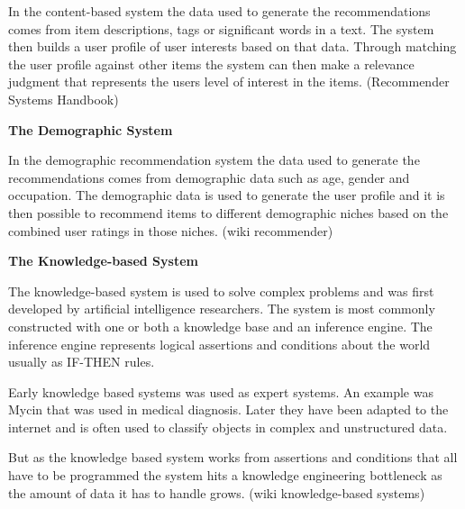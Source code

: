 In the content-based system the data used to generate the recommendations comes from item descriptions, tags or significant words in a text. The system then builds a user profile of user interests based on that data. Through matching the user profile against other items the system can then make a relevance judgment that represents the users level of interest in the items. (Recommender Systems Handbook)


\textbf{The Demographic System}

In the demographic recommendation system the data used to generate the recommendations comes from demographic data such as age, gender and occupation. The demographic data is used to generate the user profile and it is then possible to recommend items to different demographic niches based on the combined user ratings in those niches. (wiki recommender)


\textbf{The Knowledge-based System}

The knowledge-based system is used to solve complex problems and was first developed by artificial intelligence researchers. The system is most commonly constructed with one or both a knowledge base  and an inference engine. The inference engine represents logical assertions and conditions about the world usually as IF-THEN rules.

Early knowledge based systems was used as expert systems. An example was Mycin that was used in medical diagnosis. Later they have been adapted to the internet and is often used to classify objects in complex and unstructured data.

But as the knowledge based system works from assertions and conditions that all have to be programmed the system hits a knowledge engineering bottleneck as the amount of data it has to handle grows. (wiki knowledge-based systems)


